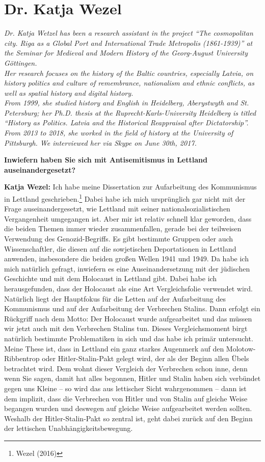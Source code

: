 \section{Dr. Katja Wezel}

\textit{Dr. Katja Wetzel has been a research assistant in the project ``The cosmopolitan city. Riga as a Global Port and International Trade Metropolis (1861-1939)'' at the Seminar for Medieval and Modern History of the Georg-August University Göttingen.\\
Her research focuses on the history of the Baltic countries, especially Latvia, on history politics and culture of remembrance, nationalism and ethnic conflicts, as well as spatial history and digital history.\\
From 1999, she studied history and English in Heidelberg, Aberystwyth and St. Petersburg; her Ph.D. thesis  at the Ruprecht-Karls-University Heidelberg is titled ``History as Politics. Latvia and the Historical Reappraisal after Dictatorship''. From 2013 to 2018, she worked in the field of history at the University of Pittsburgh. We interviewed her via Skype on June 30th, 2017.}\par 
\vspace*{2em}
\textbf{Inwiefern haben Sie sich mit Antisemitismus in Lettland auseinandergesetzt?}

\textbf{Katja Wezel:} Ich habe meine Dissertation zur Aufarbeitung des Kommunismus in Lettland geschrieben.\footnote{Wezel (2016)} Dabei habe ich mich ursprünglich gar nicht mit der Frage auseinandergesetzt, wie Lettland mit seiner nationalsozialistischen Vergangenheit umgegangen ist. Aber mir ist relativ schnell klar geworden, dass die beiden Themen immer wieder zusammenfallen, gerade bei der teilweisen Verwendung des Genozid-Begriffs. Es gibt bestimmte Gruppen oder auch Wissenschaftler, die diesen auf die sowjetischen Deportationen in Lettland anwenden, insbesondere die beiden großen Wellen 1941 und 1949. Da habe ich mich natürlich gefragt, inwiefern es eine Auseinandersetzung mit der jüdischen Geschichte und mit dem Holocaust in Lettland gibt. Dabei habe ich herausgefunden, dass der Holocaust als eine Art Vergleichsfolie verwendet wird. Natürlich liegt der Hauptfokus für die Letten auf der Aufarbeitung des Kommunismus und auf der Aufarbeitung der Verbrechen Stalins. Dann erfolgt ein Rückgriff nach dem Motto: Der Holocaust wurde aufgearbeitet und das müssen wir jetzt auch mit den Verbrechen Stalins tun. Dieses Vergleichsmoment birgt natürlich bestimmte Problematiken in sich und das habe ich primär untersucht. Meine These ist, dass in Lettland ein ganz starkes Augenmerk auf den Molotow-Ribbentrop oder Hitler-Stalin-Pakt gelegt wird, der als der Beginn allen Übels betrachtet wird. Dem wohnt dieser Vergleich der Verbrechen schon inne, denn wenn Sie sagen, damit hat alles begonnen, Hitler und Stalin haben sich verbündet gegen uns Kleine – so wird das aus lettischer Sicht wahrgenommen – dann ist dem implizit, dass die Verbrechen von Hitler und von Stalin auf gleiche Weise begangen wurden und deswegen auf gleiche Weise aufgearbeitet werden sollten. Weshalb der Hitler-Stalin-Pakt so zentral ist, geht dabei zurück auf den Beginn der lettischen Unabhängigkeitsbewegung. 

